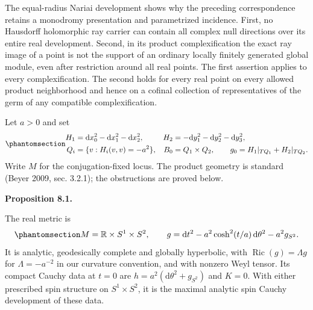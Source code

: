 \documentclass[
  english,
  11pt,
  reqno]{amsart}
\makeatletter
\newcommand{\pandocstatementheading}[1]{%
  \par\addpenalty{\@beginparpenalty}%
  \addvspace{.5\baselineskip plus .2\baselineskip minus .2\baselineskip}%
  {\normalfont\bfseries #1\par}%
  \nobreak\@afterindenttrue\@afterheading
}
\makeatother
\begin{document}
The equal-radius Nariai development shows why the preceding
correspondence retains a monodromy presentation and parametrized
incidence. First, no Hausdorff holomorphic ray carrier can contain all
complex null directions over its entire real development. Second, in its
product complexification the exact ray image of a point is not the
support of an ordinary locally finitely generated global module, even
after restriction around all real points. The first assertion applies to
every complexification. The second holds for every real point on every
allowed product neighborhood and hence on a cofinal collection of
representatives of the germ of any compatible complexification.

Let \(a>0\) and set
\begin{equation}\protect\phantomsection\label{eq:nariai-product-complexification}{
\begin{aligned}
H_1&=\mathrm dx_0^2-\mathrm dx_1^2-\mathrm dx_2^2,
&H_2&=-\mathrm dy_1^2-\mathrm dy_2^2-\mathrm dy_3^2,\\
Q_i&=\{v:H_i(v,v)=-a^2\},
&B_0&=Q_1\times Q_2,\qquad
g_0=H_1|_{TQ_1}+H_2|_{TQ_2}.
\end{aligned}
}\end{equation} Write \(M\) for the conjugation-fixed locus. The product
geometry is standard (Beyer 2009, sec. 3.2.1); the obstructions are
proved below.

\pandocstatementheading{\protect{}\label{prop:nariai-maximal-einstein-development}Proposition 8.1.}

The real metric is
\begin{equation}\protect\phantomsection\label{eq:nariai-real-metric}{
M=\mathbb R\times S^1\times S^2,
\qquad
g=\mathrm dt^2-a^2\cosh^2(t/a)\,\mathrm d\theta^2-a^2g_{S^2}.
}\end{equation} It is analytic, geodesically complete and globally
hyperbolic, with \(\operatorname{Ric}(g)=\Lambda g\) for
\(\Lambda=-a^{-2}\) in our curvature convention, and with nonzero Weyl
tensor. Its compact Cauchy data at \(t=0\) are
\(h=a^2(\mathrm d\theta^2+g_{S^2})\) and \(K=0\). With either prescribed
spin structure on \(S^1\times S^2\), it is the maximal analytic spin
Cauchy development of these data.
\end{document}
